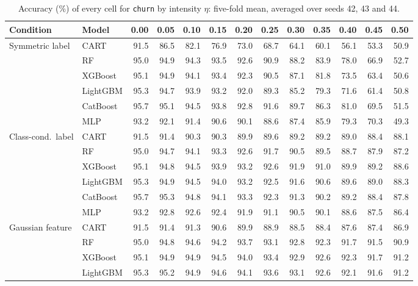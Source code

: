 \begin{table}[p]
\centering
\tiny
\setlength{\tabcolsep}{2.6pt}
\caption{Accuracy (\%) of every cell for \texttt{churn} by intensity $\eta$: five-fold mean, averaged over seeds 42, 43 and 44.}
\label{tab:grid_churn}
\begin{tabular}{@{}llrrrrrrrrrrr@{}}
\toprule
Condition & Model & 0.00 & 0.05 & 0.10 & 0.15 & 0.20 & 0.25 & 0.30 & 0.35 & 0.40 & 0.45 & 0.50 \\
\midrule
Symmetric label & CART & 91.5 & 86.5 & 82.1 & 76.9 & 73.0 & 68.7 & 64.1 & 60.1 & 56.1 & 53.3 & 50.9 \\
 & RF & 95.0 & 94.9 & 94.3 & 93.5 & 92.6 & 90.9 & 88.2 & 83.9 & 78.0 & 66.9 & 52.7 \\
 & XGBoost & 95.1 & 94.9 & 94.1 & 93.4 & 92.3 & 90.5 & 87.1 & 81.8 & 73.5 & 63.4 & 50.6 \\
 & LightGBM & 95.3 & 94.7 & 93.9 & 93.2 & 92.0 & 89.3 & 85.2 & 79.3 & 71.6 & 61.4 & 50.8 \\
 & CatBoost & 95.7 & 95.1 & 94.5 & 93.8 & 92.8 & 91.6 & 89.7 & 86.3 & 81.0 & 69.5 & 51.5 \\
 & MLP & 93.2 & 92.1 & 91.4 & 90.6 & 90.1 & 88.6 & 87.4 & 85.9 & 79.3 & 70.3 & 49.3 \\
\midrule
Class-cond.\ label & CART & 91.5 & 91.4 & 90.3 & 90.3 & 89.9 & 89.6 & 89.2 & 89.2 & 89.0 & 88.4 & 88.1 \\
 & RF & 95.0 & 94.7 & 94.1 & 93.3 & 92.6 & 91.7 & 90.5 & 89.5 & 88.7 & 87.9 & 87.2 \\
 & XGBoost & 95.1 & 94.8 & 94.5 & 93.9 & 93.2 & 92.6 & 91.9 & 91.0 & 89.9 & 89.2 & 88.6 \\
 & LightGBM & 95.3 & 94.9 & 94.5 & 94.0 & 93.2 & 92.5 & 91.6 & 90.6 & 89.6 & 89.0 & 88.3 \\
 & CatBoost & 95.7 & 95.3 & 94.8 & 94.1 & 93.3 & 92.3 & 91.3 & 90.2 & 89.2 & 88.4 & 87.8 \\
 & MLP & 93.2 & 92.8 & 92.6 & 92.4 & 91.9 & 91.1 & 90.5 & 90.1 & 88.6 & 87.5 & 86.4 \\
\midrule
Gaussian feature & CART & 91.5 & 91.4 & 91.3 & 90.6 & 89.9 & 88.9 & 88.5 & 88.4 & 87.6 & 87.4 & 86.9 \\
 & RF & 95.0 & 94.8 & 94.6 & 94.2 & 93.7 & 93.1 & 92.8 & 92.3 & 91.7 & 91.5 & 90.9 \\
 & XGBoost & 95.1 & 94.9 & 94.9 & 94.5 & 94.0 & 93.4 & 92.9 & 92.6 & 92.3 & 91.7 & 91.2 \\
 & LightGBM & 95.3 & 95.2 & 94.9 & 94.6 & 94.1 & 93.6 & 93.1 & 92.6 & 92.1 & 91.6 & 91.2 \\

\end{tabular}
\end{table}
